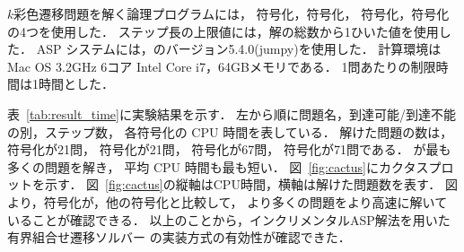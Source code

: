 $k$彩色遷移問題を解く論理プログラムには，
符号化，符号化，
符号化，符号化
の4つを使用した．
ステップ長の上限値には，解の総数から1ひいた値を使用した．
ASP システムには，{\clingo}のバージョン5.4.0(jumpy)を使用した．
計算環境は Mac OS 3.2GHz 6コア Intel Core i7，64GBメモリである．
1問あたりの制限時間は1時間とした．

表~\ref{tab:result_time}に実験結果を示す．
左から順に問題名，到達可能/到達不能の別，ステップ数，
各符号化の CPU 時間を表している．
解けた問題の数は，
符号化が21問，
符号化が21問，
符号化が67問，
符号化が71問である．
が最も多くの問題を解き，
平均 CPU 時間も最も短い．
%
図~\ref{fig:cactus}にカクタスプロットを示す．
図~\ref{fig:cactus}の縦軸はCPU時間，横軸は解けた問題数を表す．
図より，符号化が，他の符号化と比較して，
より多くの問題をより高速に解いていることが確認できる．
以上のことから，インクリメンタルASP解法を用いた有界組合せ遷移ソルバー
の実装方式の有効性が確認できた．



